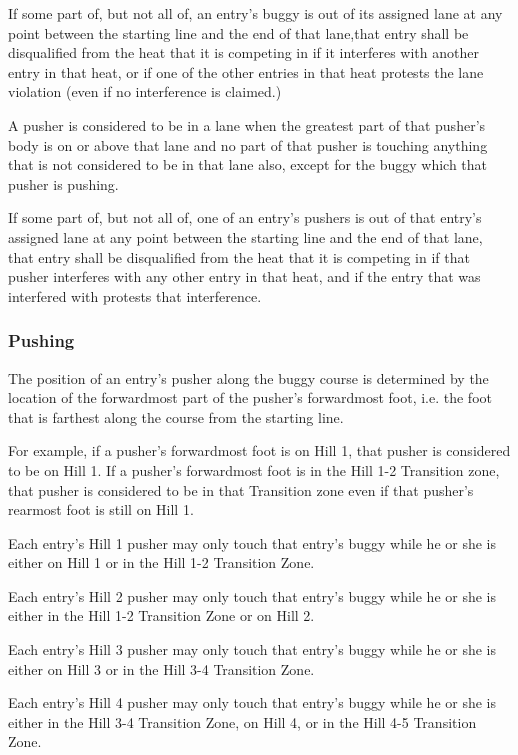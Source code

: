 If some part of, but not all of, an entry's buggy is out of its assigned lane at any point between the starting line and the end of that lane,that entry shall be disqualified from the heat that it is competing in if it interferes with another entry in that heat, or if one of the other entries in that heat protests the lane violation (even if no interference is claimed.)

A pusher is considered to be in a lane when the greatest part of that pusher's body is on or above that lane and no part of that pusher is touching anything that is not considered to be in that lane also, except for the buggy which that pusher is pushing.

If some part of, but not all of, one of an entry's pushers is out of that entry's assigned lane at any point between the starting line and the end of that lane, that entry shall be disqualified from the heat that it is competing in if that pusher interferes with any other entry in that heat, and if the entry that was interfered with protests that interference.

\subsubsection{Pushing}

The position of an entry's pusher along the buggy course is determined by the location of the forwardmost part of the pusher's forwardmost foot, i.e. the foot that is farthest along the course from the starting line.

For example, if a pusher's forwardmost foot is on Hill 1, that pusher is considered to be on Hill 1. If a pusher's forwardmost foot is in the Hill 1-2 Transition zone, that pusher is considered to be in that Transition zone even if that pusher's rearmost foot is still on Hill 1.

Each entry's Hill 1 pusher may only touch that entry's buggy while he or she is either on Hill 1 or in the Hill 1-2 Transition Zone.

Each entry's Hill 2 pusher may only touch that entry's buggy while he or she is either in the Hill 1-2 Transition Zone or on Hill 2.

Each entry's Hill 3 pusher may only touch that entry's buggy while he or she is either on Hill 3 or in the Hill 3-4 Transition Zone.

Each entry's Hill 4 pusher may only touch that entry's buggy while he or she is either in the Hill 3-4 Transition Zone, on Hill 4, or in the Hill 4-5 Transition Zone.

